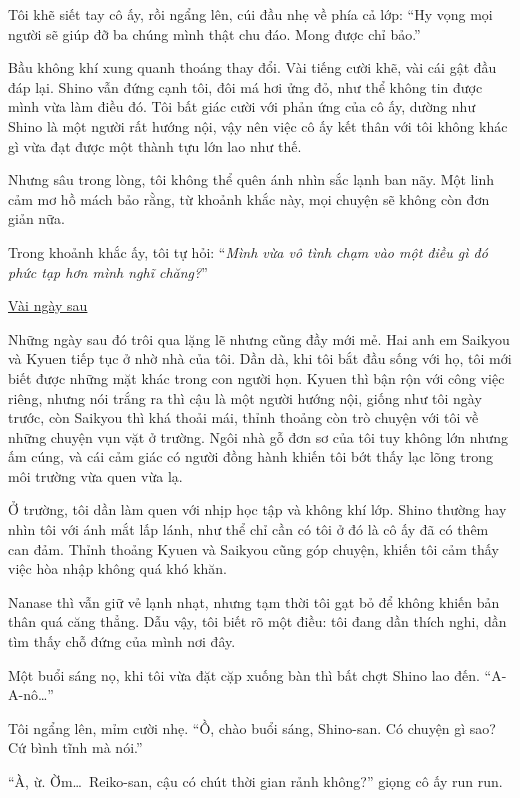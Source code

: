 \documentclass[../main.tex]{subfiles}
\begin{document}
Tôi khẽ siết tay cô ấy, rồi ngẩng lên, cúi đầu nhẹ về phía cả lớp: ``Hy vọng mọi người sẽ giúp đỡ ba chúng mình thật chu đáo. Mong được chỉ bảo.''

Bầu không khí xung quanh thoáng thay đổi. Vài tiếng cười khẽ, vài cái gật đầu đáp lại. Shino vẫn đứng cạnh tôi, đôi má hơi ửng đỏ, như thể không tin được mình vừa làm điều đó. Tôi bất giác cười với phản ứng của cô ấy, dường như Shino là một người rất hướng nội, vậy nên việc cô ấy kết thân với tôi không khác gì vừa đạt được một thành tựu lớn lao như thế.

Nhưng sâu trong lòng, tôi không thể quên ánh nhìn sắc lạnh ban nãy. Một linh cảm mơ hồ mách bảo rằng, từ khoảnh khắc này, mọi chuyện sẽ không còn đơn giản nữa.

Trong khoảnh khắc ấy, tôi tự hỏi: ``\textit{Mình vừa vô tình chạm vào một điều gì đó phức tạp hơn mình nghĩ chăng?}''

\begin{center}
  \uline{Vài ngày sau}
\end{center}

Những ngày sau đó trôi qua lặng lẽ nhưng cũng đầy mới mẻ. Hai anh em Saikyou và Kyuen tiếp tục ở nhờ nhà của tôi. Dần dà, khi tôi bắt đầu sống với họ, tôi mới biết được những mặt khác trong con người họn. Kyuen thì bận rộn với công việc riêng, nhưng nói trắng ra thì cậu là một người hướng nội, giống như tôi ngày trước, còn Saikyou thì khá thoải mái, thỉnh thoảng còn trò chuyện với tôi về những chuyện vụn vặt ở trường. Ngôi nhà gỗ đơn sơ của tôi tuy không lớn nhưng ấm cúng, và cái cảm giác có người đồng hành khiến tôi bớt thấy lạc lõng trong môi trường vừa quen vừa lạ.

Ở trường, tôi dần làm quen với nhịp học tập và không khí lớp. Shino thường hay nhìn tôi với ánh mắt lấp lánh, như thể chỉ cần có tôi ở đó là cô ấy đã có thêm can đảm. Thỉnh thoảng Kyuen và Saikyou cũng góp chuyện, khiến tôi cảm thấy việc hòa nhập không quá khó khăn.

Nanase thì vẫn giữ vẻ lạnh nhạt, nhưng tạm thời tôi gạt bỏ để không khiến bản thân quá căng thẳng. Dẫu vậy, tôi biết rõ một điều: tôi đang dần thích nghi, dần tìm thấy chỗ đứng của mình nơi đây.

Một buổi sáng nọ, khi tôi vừa đặt cặp xuống bàn thì bất chợt Shino lao đến. ``A-A-nô\dots''

Tôi ngẩng lên, mỉm cười nhẹ. ``Ồ, chào buổi sáng, Shino-san. Có chuyện gì sao? Cứ bình tĩnh mà nói.''

``À, ừ. Ờm\dots\ Reiko-san, cậu có chút thời gian rảnh không?'' giọng cô ấy run run.
\end{document}

